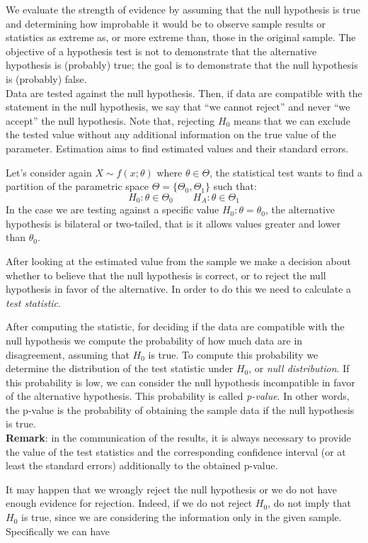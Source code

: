 \documentclass[
]{article}
\begin{document}
We evaluate the strength of evidence by assuming that the null
hypothesis is true and determining how improbable it would be to observe
sample results or statistics as extreme as, or more extreme than, those
in the original sample. The objective of a hypothesis test is not to
demonstrate that the alternative hypothesis is (probably) true; the goal
is to demonstrate that the null hypothesis is (probably) false.\\
Data are tested against the null hypothesis. Then, if data are
compatible with the statement in the null hypothesis, we say that ``we
cannot reject'' and never ``we accept'' the null hypothesis. Note that,
rejecting \(H_0\) means that we can exclude the tested value without any
additional information on the true value of the parameter. Estimation
aims to find estimated values and their standard errors.

Let's consider again \(X\sim f(x;\theta)\) where \(\theta \in \Theta\),
the statistical test wants to find a partition of the parametric space
\(\Theta = \{\Theta_0, \Theta_1\}\) such that:
\[H_0:\theta \in \Theta_0 \qquad H_A:\theta \in \Theta_1\] In the case
we are testing against a specific value \(H_0:\theta = \theta_0\), the
alternative hypothesis is bilateral or two-tailed, that is it allows
values greater and lower than \(\theta_0\).

After looking at the estimated value from the sample we make a decision
about whether to believe that the null hypothesis is correct, or to
reject the null hypothesis in favor of the alternative. In order to do
this we need to calculate a \emph{test statistic}.

After computing the statistic, for deciding if the data are compatible
with the null hypothesis we compute the probability of how much data are
in disagreement, assuming that \(H_0\) is true. To compute this
probability we determine the distribution of the test statistic under
\(H_0\), or \emph{null distribution}. If this probability is low, we can
consider the null hypothesis incompatible in favor of the alternative
hypothesis. This probability is called \emph{p-value}. In other words,
the p-value is the probability of obtaining the sample data if the null
hypothesis is true.\\
\textbf{Remark}: in the communication of the results, it is always
necessary to provide the value of the test statistics and the
corresponding confidence interval (or at least the standard errors)
additionally to the obtained p-value.

It may happen that we wrongly reject the null hypothesis or we do not
have enough evidence for rejection. Indeed, if we do not reject \(H_0\),
do not imply that \(H_0\) is true, since we are considering the
information only in the given sample. Specifically we can have
\end{document}
